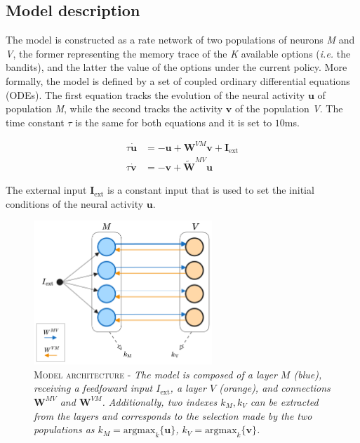 
\subsection{Model description}
The model is constructed as a rate network of two populations of neurons \textit{M} and \textit{V}, the former representing the memory trace of the \textit{K} available options (\textit{i.e.} the bandits), and the latter the value of the options under the current policy.
More formally, the model is defined by a set of coupled ordinary differential equations (ODEs).
The first equation tracks the evolution of the neural activity $\textbf{u}$ of population \textit{M}, while the second tracks the activity $\textbf{v}$ of the population \textit{V}. The time constant $\tau$ is the same for both equations and it is set to $10$ms.

\begin{equation}
\begin{aligned}
    \tau \dot{\textbf{u}}&= -\textbf{u} + \textbf{W}^{VM}\textbf{v} + \textbf{I}_{\text{ext}} \\
    \tau \dot{\textbf{v}}&= -\textbf{v} + \tilde{\textbf{W}}^{MV}\textbf{u}
\end{aligned}
\end{equation}\label{eq:main}

\noindent The external input $\textbf{I}_{\text{ext}}$ is a constant input that is used to set the initial conditions of the neural activity $\textbf{u}$. 

\begin{figure}[h]
    \centering
    \includegraphics[width=0.6\textwidth]{figures/minb_architecture.png}
    \caption{\textsc{Model architecture} - \textit{The model is composed of a layer $M$ (blue), receiving a feedfoward input $I_{\text{ext}}$, a layer $V$ (orange), and connections $\textbf{W}^{MV}$ and $\textbf{W}^{VM}$. Additionally, two indexes $k_{M}, k_{V}$  can be extracted from the layers and
    corresponds to the selection made by the two populations as $k_{M}=\text{argmax}_{k} \{\textbf{u}\}$, $k_{V}=\text{argmax}_{k} \{\textbf{v}\}$.}}
    \label{fig:main_architecture}
\end{figure}

